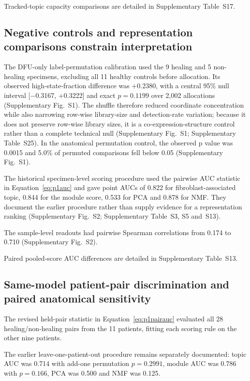 \documentclass[10pt,a4paper]{article}
\begin{document}
Tracked-topic capacity comparisons are detailed in Supplementary Table~S17.

\subsection{Negative controls and representation comparisons constrain interpretation}

The DFU-only label-permutation calibration used the 9 healing and 5 non-healing specimens, excluding all 11 healthy controls before allocation. Its observed high-state-fraction difference was +0.2380, with a central 95\% null interval {[}−0.3167, +0.3222{]} and exact $p=0.1199$ over 2,002 allocations (Supplementary Fig.~S1). The shuffle therefore reduced coordinate concentration while also narrowing row-wise library-size and detection-rate variation; because it does not preserve row-wise library sizes, it is a co-expression-structure control rather than a complete technical null (Supplementary Fig.~S1; Supplementary Table~S25). In the anatomical permutation control, the observed p value was 0.0015 and 5.0\% of permuted comparisons fell below 0.05 (Supplementary Fig.~S1).

The historical specimen-level scoring procedure used the pairwise AUC statistic in Equation~\eqref{eq:p1auc} and gave point AUCs of 0.822 for fibroblast-associated topic, 0.844 for the module score, 0.533 for PCA and 0.878 for NMF. They document the earlier procedure rather than supply evidence for a representation ranking (Supplementary Fig.~S2\label{call:p1f7}; Supplementary Table~S3, S5 and~S13).

The sample-level readouts had pairwise Spearman correlations from 0.174 to 0.710 (Supplementary Fig.~S2).



Paired pooled-score AUC differences are detailed in Supplementary Table~S13.

\subsection{Same-model patient-pair discrimination and paired anatomical sensitivity}

The revised held-pair statistic in Equation~\eqref{eq:p1pairauc} evaluated all 28 healing/non-healing pairs from the 11 patients, fitting each scoring rule on the other nine patients.

The earlier leave-one-patient-out procedure remains separately documented: topic AUC was 0.714 with add-one permutation $p=0.2991$, module AUC was 0.786 with $p=0.166$, PCA was 0.500 and NMF was 0.125.
\end{document}
